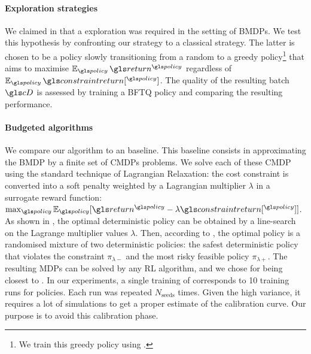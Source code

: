\paragraph{Exploration strategies} We claimed in  that a  exploration was required in the setting of \glspl{BMDP}. We test this hypothesis by confronting our strategy to a classical  strategy. The latter is chosen to be a  policy slowly transitioning from a random to a greedy policy\footnote{We train this greedy policy using \FTQ.} that aims to maximise $\expectedvalue_{\policy} \return^{\policy}$ regardless of $\expectedvalue_{\policy} \constraintreturn[^{\policy}]$. The quality of the resulting batch $\cD$ is assessed by training a \gls{BFTQ} policy and comparing the resulting performance.

\paragraph{Budgeted algorithms} We compare our \BFTQ algorithm to an \FTQl baseline. This baseline consists in approximating the BMDP by a finite set of CMDPs problems. We solve each of these CMDP using the standard technique of Lagrangian Relaxation: the cost constraint is converted into a soft penalty weighted by a Lagrangian multiplier $\lambda$ in a surrogate reward function: $\max_{\policy} \expectedvalue_{\policy}[\return^{\policy} - \lambda \constraintreturn[^{\policy}]]$.
As shown in , the optimal deterministic policy can be obtained by a line-search on the Lagrange multiplier values $\lambda$.
Then, according to \citet[Theorem 4.4]{Beutler1985}, the optimal policy is a randomised mixture of two deterministic policies: the safest deterministic policy that violates the constraint $\pi_{\lambda-}$ and the most risky feasible policy $\pi_{\lambda+}$.
The resulting \glspl{MDP} can be solved by any RL algorithm, and we chose \FTQ for being closest to \BFTQ.
In our experiments, a single training of \BFTQ corresponds to 10 training runs for \FTQl policies. Each run was repeated $N_{\text{seeds}}$ times. Given the high variance, it requires a lot of simulations to get a proper estimate of the calibration curve. Our purpose is to avoid this calibration phase.

